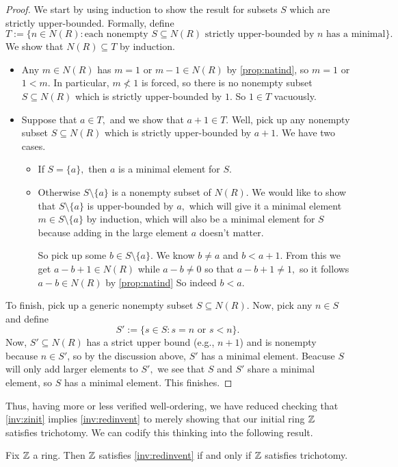 \documentclass{article}
\begin{document}
\begin{proof}
	We start by using induction to show the result for subsets $S$ which are strictly upper-bounded. Formally, define
	\[T:=\{n\in N(R):\text{each nonempty }S\subseteq N(R)\text{ strictly upper-bounded by }n\text{ has a minimal}\}.\]
	We show that $N(R)\subseteq T$ by induction.
	\begin{itemize}
		\item Any $m\in N(R)$ has $m=1$ or $m-1\in N(R)$ by \autoref{prop:natind}, so $m=1$ or $1<m.$ In particular, $m\not<1$ is forced, so there is no nonempty subset $S\subseteq N(R)$ which is strictly upper-bounded by $1.$ So $1\in T$ vacuously.
		\item Suppose that $a\in T,$ and we show that $a+1\in T.$ Well, pick up any nonempty subset $S\subseteq N(R)$ which is strictly upper-bounded by $a+1.$ We have two cases.
		\begin{itemize}
			\item If $S=\{a\},$ then $a$ is a minimal element for $S.$
			\item Otherwise $S\setminus\{a\}$ is a nonempty subset of $N(R).$ We would like to show that $S\setminus\{a\}$ is upper-bounded by $a,$ which will give it a minimal element $m\in S\setminus\{a\}$ by induction, which will also be a minimal element for $S$ because adding in the large element $a$ doesn't matter.

			So pick up some $b\in S\setminus\{a\}.$ We know $b\ne a$ and $b<a+1.$ From this we get $a-b+1\in N(R)$ while $a-b\ne0$ so that $a-b+1\ne1,$ so it follows $a-b\in N(R)$ by \autoref{prop:natind} So indeed $b<a.$
		\end{itemize}
	\end{itemize}
	To finish, pick up a generic nonempty subset $S\subseteq N(R).$ Now, pick any $n\in S$ and define
	\[S':=\{s\in S:s=n\text{ or }s<n\}.\]
	Now, $S'\subseteq N(R)$ has a strict upper bound (e.g., $n+1$) and is nonempty because $n\in S'$, so by the discussion above, $S'$ has a minimal element. Beacuse $S$ will only add larger elements to $S',$ we see that $S$ and $S'$ share a minimal element, so $S$ has a minimal element. This finishes.
\end{proof}
Thus, having more or less verified well-ordering, we have reduced checking that \autoref{inv:zinit} implies \autoref{inv:redinvent} to merely showing that our initial ring $\mathbb Z$ satisfies trichotomy. We can codify this thinking into the following result.
\begin{proposition}
	Fix $\mathbb Z$ a ring. Then $\mathbb Z$ satisfies \autoref{inv:redinvent} if and only if $\mathbb Z$ satisfies trichotomy.
\end{proposition}
\end{document}
